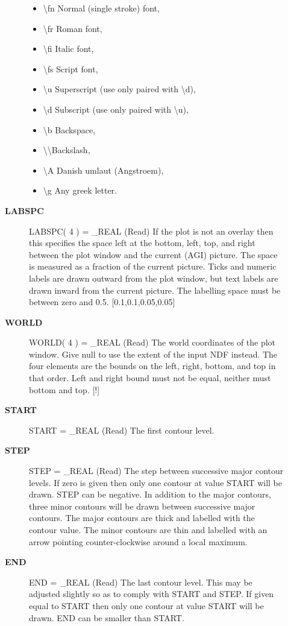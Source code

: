 \begin{description}
\begin{description}
\begin{itemize}
   \item  \textbackslash fn Normal (single stroke) font,
   \item  \textbackslash fr Roman font,
   \item  \textbackslash fi Italic font,
   \item  \textbackslash fs Script font,
   \item  \textbackslash u  Superscript (use only paired with \textbackslash d),
   \item  \textbackslash d  Subscript (use only paired with \textbackslash u),
   \item  \textbackslash b  Backspace,
   \item  \textbackslash \textbackslash   Backslash,
   \item  \textbackslash A  Danish umlaut (Angstroem),
   \item  \textbackslash g  Any greek letter.
\end{itemize}
\item [\textbf{LABSPC}]
LABSPC( 4 ) = \_REAL (Read)
   If the plot is not an overlay then this specifies the space left
   at the bottom, left, top, and right between the plot window and
   the current (AGI) picture. The space is measured as a fraction
   of the current picture. Ticks and numeric labels are drawn
   outward from the plot window, but text labels are drawn inward
   from the current picture. The labelling space must be between
   zero and 0.5. [0.1,0.1,0.05,0.05]
\item [\textbf{WORLD}]
WORLD( 4 ) = \_REAL (Read)
   The world coordinates of the plot window. Give null to use the
   extent of the input NDF instead. The four elements are the
   bounds on the left, right, bottom, and top in that order. Left
   and right bound must not be equal, neither must bottom and top.
   [!]
\item [\textbf{START}]
START = \_REAL (Read)
   The first contour level.
\item [\textbf{STEP}]
STEP = \_REAL (Read)
   The step between successive major contour levels. If zero is given
   then only one contour at value START will be drawn. STEP can be
   negative. In addition to the major contours, three minor contours
   will be drawn between successive major contours. The major contours
   are thick and labelled with the contour value. The minor contours
   are thin and labelled with an arrow pointing counter-clockwise
   around a local maximum.
\item [\textbf{END}]
END = \_REAL (Read)
   The last contour level. This may be adjusted slightly so as to
   comply with START and STEP. If given equal to START then only
   one contour at value START will be drawn. END can be smaller
   than START.


\end{description}
\end{description}
